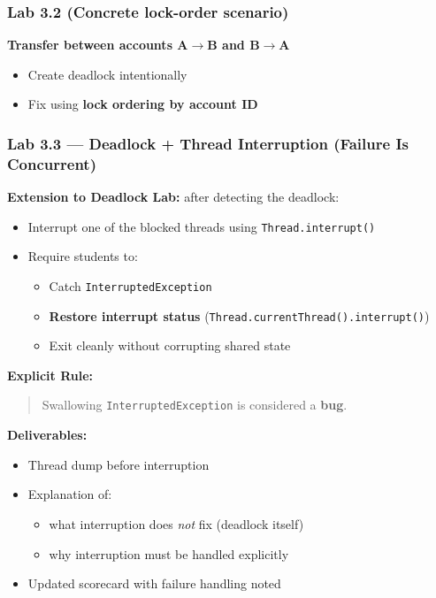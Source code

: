 \documentclass[11pt,a4paper]{article}
\begin{document}
	\subsubsection*{Lab 3.2 (Concrete lock-order scenario)}
	\textbf{Transfer between accounts A$\rightarrow$B and B$\rightarrow$A}
	\begin{itemize}[leftmargin=*]
		\item Create deadlock intentionally
		\item Fix using \textbf{lock ordering by account ID}
	\end{itemize}
	
	\subsubsection*{Lab 3.3 --- Deadlock + Thread Interruption (Failure Is Concurrent)}
	\textbf{Extension to Deadlock Lab:} after detecting the deadlock:
	\begin{itemize}[leftmargin=*]
		\item Interrupt one of the blocked threads using \texttt{Thread.interrupt()}
		\item Require students to:
		\begin{itemize}[leftmargin=*]
			\item Catch \texttt{InterruptedException}
			\item \textbf{Restore interrupt status} (\texttt{Thread.currentThread().interrupt()})
			\item Exit cleanly without corrupting shared state
		\end{itemize}
	\end{itemize}
	
	\textbf{Explicit Rule:}
	\begin{quote}
		Swallowing \texttt{InterruptedException} is considered a \textbf{bug}.
	\end{quote}
	
	\textbf{Deliverables:}
	\begin{itemize}[leftmargin=*]
		\item Thread dump before interruption
		\item Explanation of:
		\begin{itemize}[leftmargin=*]
			\item what interruption does \textit{not} fix (deadlock itself)
			\item why interruption must be handled explicitly
		\end{itemize}
		\item Updated scorecard with failure handling noted
	\end{itemize}
	
\end{document}
